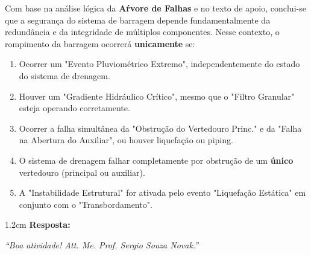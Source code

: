 \documentclass[12pt]{article}
\begin{document}
Com base na an\'alise l\'ogica da \textbf{A\'rvore de Falhas} e no texto de apoio, conclui-se que a seguran\c{c}a do sistema de barragem depende fundamentalmente da redund\^ancia e da integridade de m\'ultiplos componentes. Nesse contexto, o rompimento da barragem ocorrer\'a \textbf{unicamente} se:

\begin{enumerate}[label=\Alph*)]
  \item Ocorrer um "Evento Pluviom\'etrico Extremo", independentemente do estado do sistema de drenagem.
  \item Houver um "Gradiente Hidr\'aulico Cr\'itico", mesmo que o "Filtro Granular" esteja operando corretamente.
  \item Ocorrer a falha simult\^anea da "Obstru\c{c}\~ao do Vertedouro Princ." e da "Falha na Abertura do Auxiliar", ou houver liquefação ou piping.
  \item O sistema de drenagem falhar completamente por obstrução de um \textbf{único} vertedouro (principal ou auxiliar).
  \item A "Instabilidade Estrutural" for ativada pelo evento "Liquefa\c{c}\~ao Est\'atica" em conjunto com o "Transbordamento".
\end{enumerate}

\begin{resposta}{1.2cm}
  \textbf{Resposta:}
\end{resposta}

\vspace{0.5cm}
\vspace{0.5cm}



\vspace{0.8cm}

\begin{center}
  \textit{``Boa atividade! Att. Me. Prof. Sergio Souza Novak.''}
\end{center}

\end{document}
